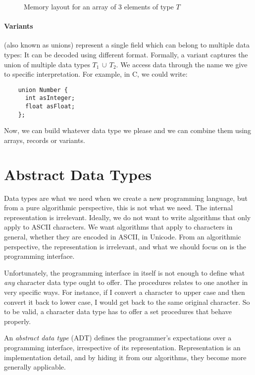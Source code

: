 \documentclass{aldast}
\begin{document}
  \begin{figure}[htbp]
    \begin{center}
      
    \end{center}
    \caption{Memory layout for an array of 3 elements of type $T$}
    \label{fig:array}
  \end{figure}
  
\paragraph{Variants} (also known as unions) represent a single field which
  can belong to multiple data types: It can be decoded using different
  format. Formally, a variant captures the union of multiple data
  types $T_1 \, \cup \, T_2$. We access data through the name we give
  to specific interpretation. For example, in C, we could write:
  \begin{verbatim}
    union Number {
      int asInteger;
      float asFloat;
    };
  \end{verbatim}


Now, we can build whatever data type we please and we can combine them
using arrays, records or variants.

\section{Abstract Data Types}
\label{sec:adt}

Data types are what we need when we create a new programming language,
but from a pure algorithmic perspective, this is not what we need. The
internal representation is irrelevant. Ideally, we do not want to
write algorithms that only apply to ASCII characters. We want
algorithms that apply to characters in general, whether they are
encoded in ASCII, in Unicode. From an algorithmic perspective, the
representation is irrelevant, and what we should focus on is the
programming interface.

Unfortunately, the programming interface in itself is not enough to
define what \emph{any} character data type ought to offer. The
procedures relates to one another in very specific ways. For instance,
if I convert a character to upper case and then convert it back to
lower case, I would get back to the same original character. So to be
valid, a character data type has to offer a set procedures that behave
properly.

An \emph{abstract data type} (ADT) defines the
programmer's expectations over a programming interface, irrespective
of its representation. Representation is an implementation detail, and
by hiding it from our algorithms, they become more generally
applicable.
\end{document}
